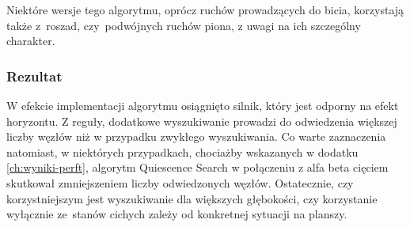 Niektóre wersje tego algorytmu, oprócz ruchów prowadzących do bicia, korzystają także z~roszad, czy~podwójnych ruchów piona, z uwagi na ich szczególny charakter.

\subsubsection{Rezultat}

W efekcie implementacji algorytmu osiągnięto silnik, który jest odporny na efekt horyzontu.
Z reguły, dodatkowe wyszukiwanie prowadzi do odwiedzenia większej liczby węzłów niż w przypadku zwykłego wyszukiwania.
Co warte zaznaczenia natomiast, w niektórych przypadkach, chociażby wskazanych w dodatku \ref{ch:wyniki-perft}, algorytm Quiescence Search w połączeniu z alfa beta cięciem skutkował zmniejszeniem liczby odwiedzonych węzłów.
Ostatecznie, czy korzystniejszym jest wyszukiwanie dla większych głębokości, czy korzystanie wyłącznie ze~stanów cichych zależy od konkretnej sytuacji na planszy.